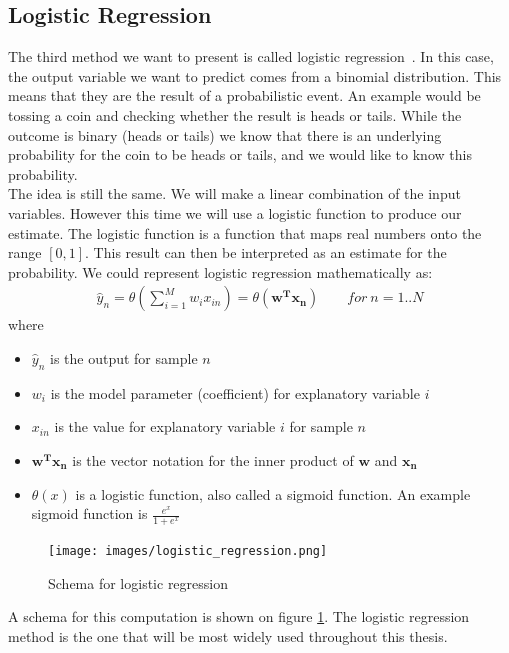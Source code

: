 \subsection{Logistic Regression}
\label{subsec:glm-logistic-regression}
The third method we want to present is called logistic regression~\cite{caltechmachinelearning}\cite{wikilogistic}. In this case, the output variable we want to predict comes from a binomial distribution. This means that they are the result of a probabilistic event. An example would be tossing a coin and checking whether the result is heads or tails. While the outcome is binary (heads or tails) we know that there is an underlying probability for the coin to be heads or tails, and we would like to know this probability. \\
The idea is still the same. We will make a linear combination of the input variables. However this time we will use a logistic function to produce our estimate. The logistic function is a function that maps real numbers onto the range $[0,1]$. This result can then be interpreted as an estimate for the probability. We could represent logistic regression mathematically as:
\begin{equation}
\label{eq:glm-logistic-regression}
\begin{split}
\hat{y}_{n} = \theta(\sum_{i=1}^{M}w_{i}x_{in})= \theta(\bm{w^{T}x_{n}}) \qquad for\ n=1..N
\end{split}
\end{equation}
where
\begin{itemize}
	\item $\hat{y}_{n}$ is the output for sample $n$
	\item $w_{i}$ is the model parameter (coefficient) for explanatory variable $i$
	\item $x_{in}$ is the value for explanatory variable $i$ for sample $n$
	\item $\bm{w^{T}x_{n}}$ is the vector notation for the inner product of $\bm{w}$ and $\bm{x_{n}}$
	\item $\theta(x)$ is a logistic function, also called a sigmoid function. An example sigmoid function is $\frac{e^{x}}{1+e^{x}}$
\end{itemize}
\begin{figure}
	\centering
	\texttt{[image: images/logistic\_regression.png]}
	\caption{Schema for logistic regression}
	\label{fig:glm-logistic-regression}
\end{figure}
A schema for this computation is shown on figure \ref{fig:glm-logistic-regression}.
The logistic regression method is the one that will be most widely used throughout this thesis.

